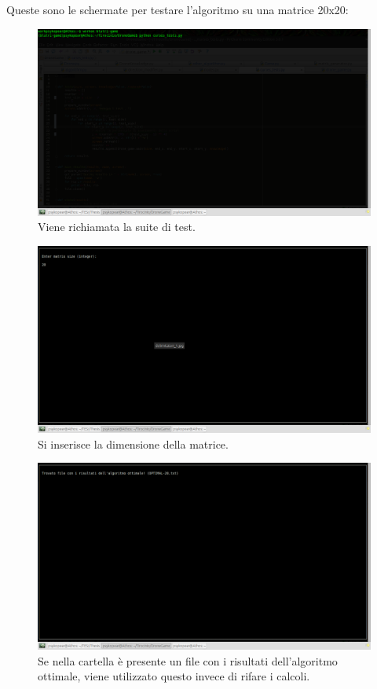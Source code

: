 Queste sono le schermate per testare l'algoritmo su una matrice 20x20:
\begin{figure}[hb]
\center
\includegraphics[width=\textwidth]{immagini/Test1.png}
\caption{Viene richiamata la suite di test.}
\end{figure}

\begin{figure}[hb]
\center
\includegraphics[width=\textwidth]{immagini/Test1-1.png}
\caption{Si inserisce la dimensione della matrice.}
\end{figure}

\begin{figure}[hb]
\center
\includegraphics[width=\textwidth]{immagini/test2.png}
\caption{Se nella cartella è presente un file con i risultati dell'algoritmo ottimale, viene utilizzato questo invece di rifare i calcoli.}
\end{figure}

